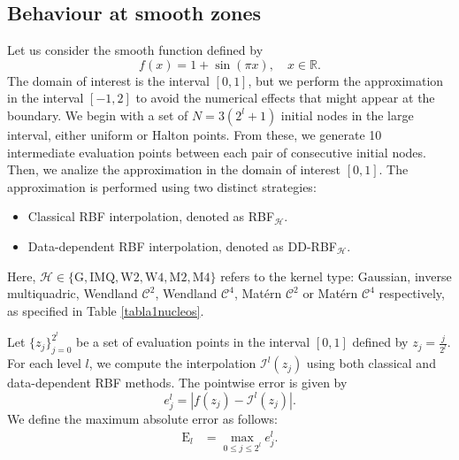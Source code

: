 \documentclass[preprint]{elsarticle}       %
\begin{document}
\subsection{Behaviour at smooth zones}
Let us consider the smooth function defined by
\[
f(x) = 1+\sin(\pi x), \quad x \in \mathbb{R}.
\]
The domain of interest is the interval $[0, 1]$, but we perform the approximation in the interval $[-1,2]$ to avoid the numerical effects that might appear at the boundary. We begin with a set of $N = 3(2^l+1)$ initial nodes in the large interval, either uniform or Halton points. From these, we generate 10 intermediate evaluation points between each pair of consecutive initial nodes. Then, we analize the approximation in the domain of interest $[0, 1]$. The approximation is performed using two distinct strategies:
\begin{itemize}
    \item Classical RBF interpolation, denoted as RBF$_{\mathcal{H}}$.
    \item Data-dependent RBF interpolation, denoted as DD-RBF$_{\mathcal{H}}$.
\end{itemize}
Here, $\mathcal{H} \in \{\text{G}, \text{IMQ},\text{W2}, \text{W4}, \text{M2}, \text{M4} \}$ refers to the kernel type: Gaussian, inverse multiquadric, Wendland $\mathcal{C}^2$, Wendland $\mathcal{C}^4$, Mat\'ern $\mathcal{C}^2$ or Mat\'ern $\mathcal{C}^4$  respectively, as specified in Table \ref{tabla1nucleos}.


Let $\{z_j\}_{j=0}^{2^{l}}$ be a set of evaluation points in the interval $[0,1]$ defined by $z_j = \frac{j}{2^l}$. For each level $l$, we compute the interpolation $\mathcal{I}^l(z_j)$ using both classical and data-dependent RBF methods. The pointwise error is given by
\[
e^l_j = \left| f(z_j) - \mathcal{I}^l(z_j) \right|.
\]
We define the maximum absolute error %
as follows:
\begin{equation}
\label{eq:error_rate}
\begin{aligned}
\text{E}_l &= \max_{0 \leq j \leq 2^l} e^l_j.%
\end{aligned}
\end{equation}
\end{document}
